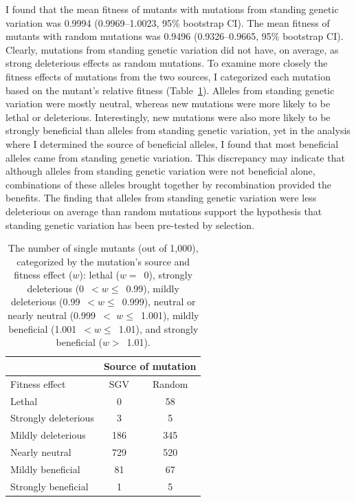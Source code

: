 \begin{doublespace}
I found that the mean fitness of mutants
with mutations from standing genetic variation
was 0.9994 (0.9969--1.0023, 95\% bootstrap CI).
%
The mean fitness of mutants with random mutations
was 0.9496 (0.9326--0.9665, 95\% bootstrap CI).
%
Clearly, mutations from standing genetic variation
did not have, on average, as strong deleterious effects
as random mutations.
%
To examine more closely the fitness effects
of mutations from the two sources,
I categorized each mutation based on
the mutant's relative fitness (Table~\ref{mutant_fitness_table}).
%
Alleles from standing genetic variation were mostly neutral,
whereas new mutations were more likely to be lethal or deleterious.
%
Interestingly, new mutations were also more likely
to be strongly beneficial than alleles from standing genetic variation,
yet in the analysis where I determined the source of beneficial alleles,
I found that most beneficial alleles came from standing genetic variation.
%
This discrepancy may indicate that although alleles
from standing genetic variation were not beneficial alone,
combinations of these alleles brought together
by recombination provided the benefits.
%
The finding that alleles from standing genetic variation
were less deleterious on average than random mutations
support the hypothesis that standing genetic variation
has been pre-tested by selection.



\begin{table}
\begin{center}
\begin{tabular}{|l|c|c|}
\cline{2-3}
\multicolumn{1}{l}{} & \multicolumn{2}{|c|}{Source of mutation} \\
\hline
Fitness effect & SGV & Random \\
\hline\hline
Lethal & 0 & 58 \\
Strongly deleterious & 3 & 5 \\
Mildly deleterious & 186 & 345 \\
Nearly neutral & 729 & 520 \\
Mildly beneficial & 81 & 67 \\
Strongly beneficial & 1 & 5 \\
\hline
\end{tabular}
\caption{The number of single mutants (out of 1,000),
  categorized by the mutation's source and fitness effect ($w$):
  lethal ($w =$~0),
  strongly deleterious (0~$< w \le$~0.99),
  mildly deleterious (0.99~$< w \le$~0.999),
  neutral or nearly neutral (0.999~$<$ $w \le$~1.001),
  mildly beneficial (1.001~$< w \le$~1.01),
  and strongly beneficial ($w >$~1.01).}
\label{mutant_fitness_table}
\end{center}
\end{table}




\end{doublespace}

